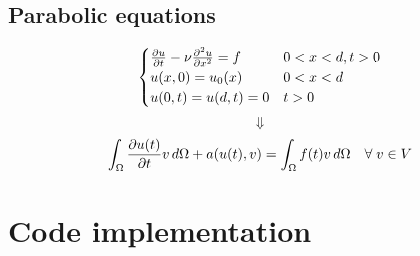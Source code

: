 \documentclass[a4paper,11pt]{article}
\theoremstyle{break}
\numberwithin{equation}{section}
\begin{document}
\subsection*{Parabolic equations}
\begin{equation*}
    \begin{cases}
        \partialderivative{u}{t} - \nu \partialderivative{^2u}{x^2} = f & 0 < x <d, t> 0 \\
        u(x,0) = u_0(x) & 0 < x < d \\
        u(0,t) = u(d,t) = 0 & t>0
    \end{cases}
    \label{one_dim_pbl}
\end{equation*}
\[
    \Downarrow
\]
\begin{equation*}
    \int_{\Omega} \partialderivative{u(t)}{t} v \, d\Omega + a(u(t), v) = \int_\Omega f(t)v \, d\Omega \quad \forall \; v \in V 
    \label{weak_formulation_heat_pbl}
\end{equation*}
\section*{Code implementation}
\end{document}
